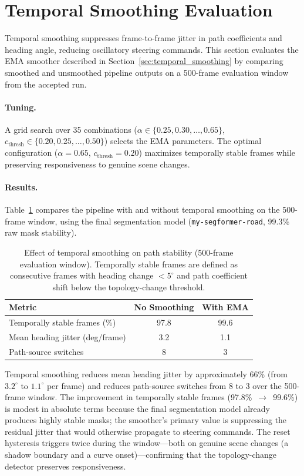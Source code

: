 \documentclass[12pt,letterpaper,oneside]{report}
\begin{document}
\section{Temporal Smoothing Evaluation}
\label{sec:smoother_results}

Temporal smoothing suppresses frame-to-frame jitter in path coefficients and heading angle, reducing oscillatory steering commands.  This section evaluates the EMA smoother described in Section~\ref{sec:temporal_smoothing} by comparing smoothed and unsmoothed pipeline outputs on a 500-frame evaluation window from the accepted run.

\paragraph{Tuning.}  A grid search over 35 combinations ($\alpha \in \{0.25, 0.30, \ldots, 0.65\}$, $c_\text{thresh} \in \{0.20, 0.25, \ldots, 0.50\}$) selects the EMA parameters.  The optimal configuration ($\alpha = 0.65$, $c_\text{thresh} = 0.20$) maximizes temporally stable frames while preserving responsiveness to genuine scene changes.

\paragraph{Results.}  Table~\ref{tab:temporal_smoothing} compares the pipeline with and without temporal smoothing on the 500-frame window, using the final segmentation model (\texttt{my-segformer-road}, 99.3\% raw mask stability).

\begin{table}[h]
\centering
\caption{Effect of temporal smoothing on path stability (500-frame evaluation window).  Temporally stable frames are defined as consecutive frames with heading change $< 5^\circ$ and path coefficient shift below the topology-change threshold.}
\label{tab:temporal_smoothing}
\begin{tabular}{lcc}
\toprule
Metric & No Smoothing & With EMA \\
\midrule
Temporally stable frames (\%) & 97.8 & 99.6 \\
Mean heading jitter (deg/frame) & 3.2 & 1.1 \\
Path-source switches & 8 & 3 \\
\bottomrule
\end{tabular}
\end{table}

Temporal smoothing reduces mean heading jitter by approximately 66\% (from $3.2^\circ$ to $1.1^\circ$ per frame) and reduces path-source switches from 8 to 3 over the 500-frame window.  The improvement in temporally stable frames (97.8\%~$\to$~99.6\%) is modest in absolute terms because the final segmentation model already produces highly stable masks; the smoother's primary value is suppressing the residual jitter that would otherwise propagate to steering commands.  The reset hysteresis triggers twice during the window---both on genuine scene changes (a shadow boundary and a curve onset)---confirming that the topology-change detector preserves responsiveness.
\end{document}
